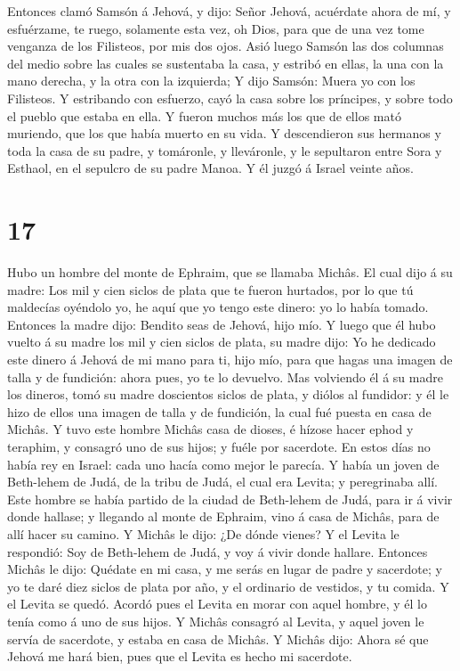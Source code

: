 Entonces clamó Samsón á Jehová, y dijo: Señor Jehová, acuérdate ahora de
mí, y esfuérzame, te ruego, solamente esta vez, oh Dios, para que de una
vez tome venganza de los Filisteos, por mis dos ojos. 
Asió luego Samsón las dos columnas del medio sobre las cuales se
sustentaba la casa, y estribó en ellas, la una con la mano derecha, y la
otra con la izquierda;  Y dijo Samsón: Muera yo con los
Filisteos. Y estribando con esfuerzo, cayó la casa sobre los príncipes,
y sobre todo el pueblo que estaba en ella. Y fueron muchos más los que
de ellos mató muriendo, que los que había muerto en su vida.
 Y descendieron sus hermanos y toda la casa de su padre,
y tomáronle, y lleváronle, y le sepultaron entre Sora y Esthaol, en el
sepulcro de su padre Manoa. Y él juzgó á Israel veinte años.

\hypertarget{section-16}{%
\section{17}\label{section-16}}

 Hubo un hombre del monte de Ephraim, que se llamaba
Michâs.  El cual dijo á su madre: Los mil y cien siclos de
plata que te fueron hurtados, por lo que tú maldecías oyéndolo yo, he
aquí que yo tengo este dinero: yo lo había tomado. Entonces la madre
dijo: Bendito seas de Jehová, hijo mío.  Y luego que él
hubo vuelto á su madre los mil y cien siclos de plata, su madre dijo: Yo
he dedicado este dinero á Jehová de mi mano para ti, hijo mío, para que
hagas una imagen de talla y de fundición: ahora pues, yo te lo devuelvo.
 Mas volviendo él á su madre los dineros, tomó su madre
doscientos siclos de plata, y diólos al fundidor: y él le hizo de ellos
una imagen de talla y de fundición, la cual fué puesta en casa de
Michâs.  Y tuvo este hombre Michâs casa de dioses, é
hízose hacer ephod y teraphim, y consagró uno de sus hijos; y fuéle por
sacerdote.  En estos días no había rey en Israel: cada uno
hacía como mejor le parecía.  Y había un joven de
Beth-lehem de Judá, de la tribu de Judá, el cual era Levita; y
peregrinaba allí.  Este hombre se había partido de la
ciudad de Beth-lehem de Judá, para ir á vivir donde hallase; y llegando
al monte de Ephraim, vino á casa de Michâs, para de allí hacer su
camino.  Y Michâs le dijo: ¿De dónde vienes? Y el Levita
le respondió: Soy de Beth-lehem de Judá, y voy á vivir donde hallare.
 Entonces Michâs le dijo: Quédate en mi casa, y me serás
en lugar de padre y sacerdote; y yo te daré diez siclos de plata por
año, y el ordinario de vestidos, y tu comida. Y el Levita se quedó.
 Acordó pues el Levita en morar con aquel hombre, y él lo
tenía como á uno de sus hijos.  Y Michâs consagró al
Levita, y aquel joven le servía de sacerdote, y estaba en casa de
Michâs.  Y Michâs dijo: Ahora sé que Jehová me hará bien,
pues que el Levita es hecho mi sacerdote.

